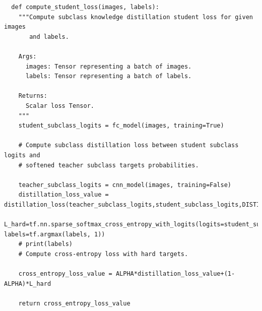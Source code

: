 \documentclass[conference]{IEEEtran}
\begin{document}
  \begin{lstlisting}
  def compute_student_loss(images, labels):
    """Compute subclass knowledge distillation student loss for given images
       and labels.
  
    Args:
      images: Tensor representing a batch of images.
      labels: Tensor representing a batch of labels.
  
    Returns:
      Scalar loss Tensor.
    """
    student_subclass_logits = fc_model(images, training=True)
  
    # Compute subclass distillation loss between student subclass logits and
    # softened teacher subclass targets probabilities.
  
    teacher_subclass_logits = cnn_model(images, training=False)
    distillation_loss_value = distillation_loss(teacher_subclass_logits,student_subclass_logits,DISTILLATION_TEMPERATURE)
    L_hard=tf.nn.sparse_softmax_cross_entropy_with_logits(logits=student_subclass_logits, labels=tf.argmax(labels, 1))
    # print(labels)
    # Compute cross-entropy loss with hard targets.
  
    cross_entropy_loss_value = ALPHA*distillation_loss_value+(1-ALPHA)*L_hard
  
    return cross_entropy_loss_value
  \end{lstlisting}
  
\end{document}
